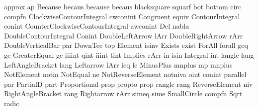  approx                          ap
 Because                         becaus
 because                         becaus
 blacksquare                     squarf
 bot                             bottom
 circ                            compfn
 ClockwiseContourIntegral        cwconint
 Congruent                       equiv
 ContourIntegral                 conint
 CounterClockwiseContourIntegral awconint
 Del                             nabla
 DoubleContourIntegral           Conint
 DoubleLeftArrow                 lArr
 DoubleRightArrow                rArr
 DoubleVerticalBar               par
 DownTee                         top
 Element                         isinv
 Exists                          exist
 ForAll                          forall
 geq                             ge
 GreaterEqual                    ge
 iiiint                          qint
 iiint                           tint
 Implies                         rArr
 in                              isin
 Integral                        int
 langle                          lang
 LeftAngleBracket                lang
 Leftarrow                       lArr
 leq                             le
 MinusPlus                       mnplus
 mp                              mnplus
 NotElement                      notin
 NotEqual                        ne
 NotReverseElement               notniva
 oint                            conint
 parallel                        par
 PartialD                        part
 Proportional                    prop
 propto                          prop
 rangle                          rang
 ReverseElement                  niv
 RightAngleBracket               rang
 Rightarrow                      rArr
 simeq                           sime
 SmallCircle                     compfn
 Sqrt                            radic
